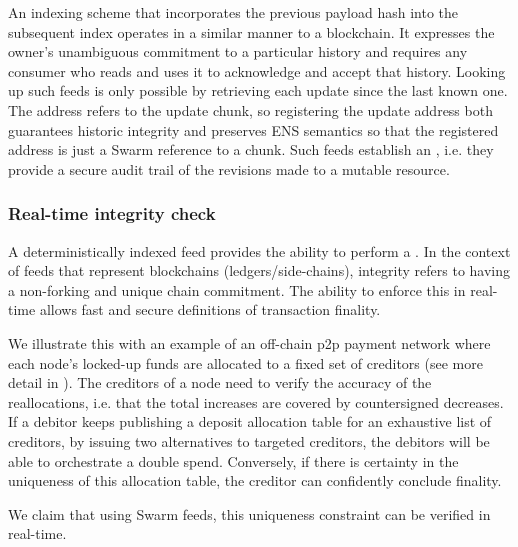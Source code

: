 An indexing scheme that incorporates the previous payload hash into the subsequent index operates in a similar manner to a blockchain. It expresses the owner's unambiguous commitment to a particular history and requires any consumer who reads and uses it to acknowledge and accept that history. 
Looking up such feeds is only possible by retrieving each update since the last known one. The address refers to the update chunk, so registering the update address both guarantees historic integrity and preserves ENS semantics so that the registered address is just a Swarm reference to a chunk.
Such feeds establish an , i.e. they provide a secure audit trail of the revisions made to a mutable resource. 

\subsubsection{Real-time integrity check}

A deterministically indexed feed provides the ability to perform a . In the context of feeds that represent blockchains (ledgers/side-chains), integrity refers to having a non-forking and unique chain commitment. The ability to enforce this in real-time allows fast and secure definitions of transaction finality. 

We illustrate this with an example of an off-chain p2p payment network where each node's locked-up funds are allocated to a fixed set of creditors (see more detail in \citealp{ethersphere2019swap}). The creditors of a node need to verify the accuracy of the reallocations, i.e. that the total increases are covered by countersigned decreases. 
If a debitor keeps publishing a deposit allocation table for an exhaustive list of creditors, by issuing two alternatives to targeted creditors, the debitors will be able to orchestrate a double spend. Conversely, if there is certainty in the uniqueness of this allocation table, the creditor can confidently conclude finality.

We claim that using Swarm feeds, this uniqueness constraint can be verified in real-time.

